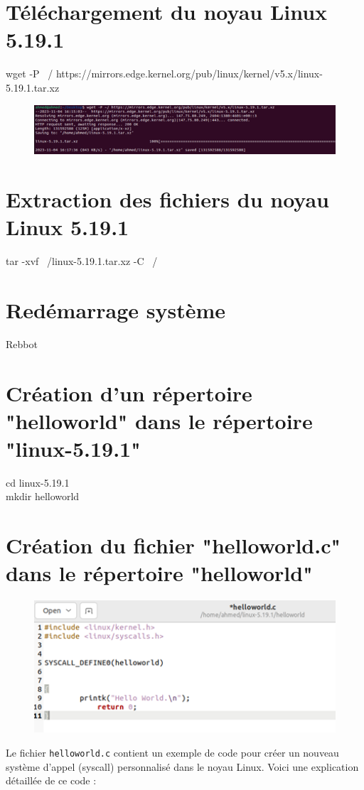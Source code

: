 \section{	Téléchargement du noyau Linux 5.19.1}
wget -P ~/ https://mirrors.edge.kernel.org/pub/linux/kernel/v5.x/linux-5.19.1.tar.xz
 \begin{figure}[h]
    \includegraphics[width=1\textwidth]{images/28.png}   
\end{figure}
\section{Extraction des fichiers du noyau Linux 5.19.1}
tar -xvf ~/linux-5.19.1.tar.xz -C ~/
\section{Redémarrage système}
Rebbot
\section{Création d'un répertoire "helloworld" dans le répertoire "linux-5.19.1"}
cd linux-5.19.1
\\mkdir helloworld
\section{	Création du fichier "helloworld.c" dans le répertoire "helloworld"}
\begin{figure}[h]
    \includegraphics[width=1\textwidth]{images/29.png}   
\end{figure}
Le fichier \texttt{helloworld.c} contient un exemple de code pour créer un nouveau système d'appel (syscall) personnalisé dans le noyau Linux. Voici une explication détaillée de ce code :

